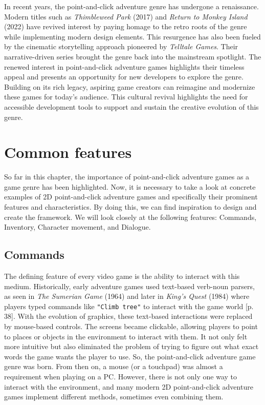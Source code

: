 In recent years, the point-and-click adventure genre has undergone a renaissance. Modern titles such as \textit{Thimbleweed Park} (2017) and \textit{Return to Monkey Island} (2022) have revived interest by paying homage to the retro roots of the genre while implementing modern design elements. This resurgence has also been fueled by the cinematic storytelling approach pioneered by \textit{Telltale Games}. Their narrative-driven series brought the genre back into the mainstream spotlight. The renewed interest in point-and-click adventure games highlights their timeless appeal and presents an opportunity for new developers to explore the genre. Building on its rich legacy, aspiring game creators can reimagine and modernize these games for today's audience. This cultural revival highlights the need for accessible development tools to support and sustain the creative evolution of this genre.

\section{Common features}
\label{sec:Common features}
So far in this chapter, the importance of point-and-click adventure games as a game genre has been highlighted. Now, it is necessary to take a look at concrete examples of 2D point-and-click adventure games and specifically their prominent features and characteristics. By doing this, we can find inspiration to design and create the framework. We will look closely at the following features: Commands, Inventory, Character movement, and Dialogue.

\subsection{Commands}
\label{sec:Commands}
The defining feature of every video game is the ability to interact with this medium. Historically, early adventure games used text-based verb-noun parsers, as seen in \textit{The Sumerian Game} (1964) and later in \textit{King's Quest} (1984) where players typed commands like \texttt{"Climb tree"} to interact with the game world \cite{Salter2014}[p. 38]. With the evolution of graphics, these text-based interactions were replaced by mouse-based controls. The screens
became clickable, allowing players to point to places or objects in the environment to interact with them.  It not only felt more intuitive but also eliminated the problem of trying to figure out what exact words the game wants the player to use. So, the point-and-click adventure game genre was born. From then on, a mouse (or a touchpad) was almost a requirement when playing on a PC. However, there is not only one way to interact with the environment, and many modern 2D point-and-click adventure games implement different methods, sometimes even combining them.

